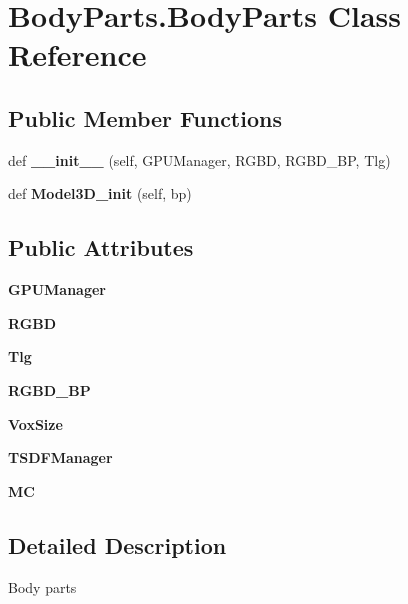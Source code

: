 \section{Body\+Parts.\+Body\+Parts Class Reference}
\label{class_body_parts_1_1_body_parts}
\subsection*{Public Member Functions}
\begin{DoxyCompactItemize}
\item 
def \textbf{ \+\_\+\+\_\+init\+\_\+\+\_\+} (self, G\+P\+U\+Manager, R\+G\+BD, R\+G\+B\+D\+\_\+\+BP, Tlg)
\item 
def \textbf{ Model3\+D\+\_\+init} (self, bp)
\end{DoxyCompactItemize}
\subsection*{Public Attributes}
\begin{DoxyCompactItemize}
\item 
\mbox{\label{class_body_parts_1_1_body_parts_ab3a2fc59ff473104c3f51a2f3f9c5010}} 
{\bfseries G\+P\+U\+Manager}
\item 
\mbox{\label{class_body_parts_1_1_body_parts_ac1812d58953dcb8afbc9e1f3265e7ca4}} 
{\bfseries R\+G\+BD}
\item 
\mbox{\label{class_body_parts_1_1_body_parts_a39bad48cedf4b87ed875975ff13bd642}} 
{\bfseries Tlg}
\item 
\mbox{\label{class_body_parts_1_1_body_parts_a7f470c49a980e43e653f020e62ab7365}} 
{\bfseries R\+G\+B\+D\+\_\+\+BP}
\item 
\mbox{\label{class_body_parts_1_1_body_parts_ab1441a0be27dc35510f8ab0d450a5059}} 
{\bfseries Vox\+Size}
\item 
\mbox{\label{class_body_parts_1_1_body_parts_afbbad8811acdf0e0ecaf8f2a62b5e00d}} 
{\bfseries T\+S\+D\+F\+Manager}
\item 
\mbox{\label{class_body_parts_1_1_body_parts_a461ad5d0d38ec1e94a0162f4f560f3c3}} 
{\bfseries MC}
\end{DoxyCompactItemize}


\subsection{Detailed Description}
\begin{DoxyVerb}Body parts
\end{DoxyVerb}
 

